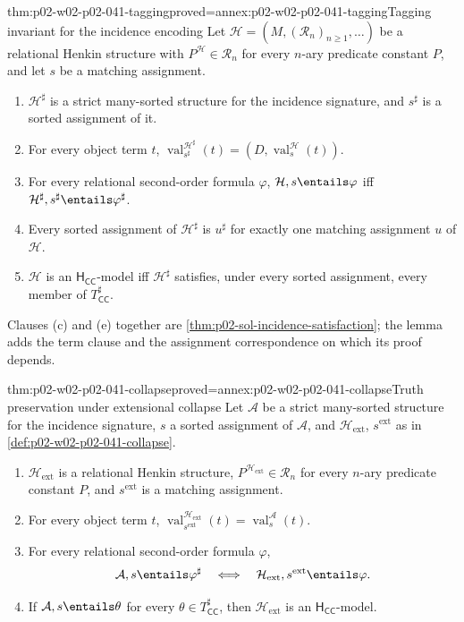 \begin{hblemma}{thm:p02-w02-p02-041-tagging}{proved=annex:p02-w02-p02-041-tagging}{Tagging invariant for the incidence encoding}
Let \(\mathcal H=(M,(\mathcal R_n)_{n\geq1},\ldots)\) be a relational Henkin
structure with \(P^{\mathcal H}\in\mathcal R_n\) for every \(n\)-ary predicate
constant \(P\), and let \(s\) be a matching assignment.
\begin{enumerate}
\item[(a)] \(\mathcal H^\sharp\) is a strict many-sorted structure for the
incidence signature, and \(s^\sharp\) is a sorted assignment of it.
\item[(b)] For every object term \(t\),
\(\operatorname{val}^{\mathcal H^\sharp}_{s^\sharp}(t)=(D,\operatorname{val}^{\mathcal H}_s(t))\).
\item[(c)] For every relational second-order formula \(\varphi\),
\(\mathcal H,s\entails\varphi\) iff
\(\mathcal H^\sharp,s^\sharp\entails\varphi^\sharp\).
\item[(d)] Every sorted assignment of \(\mathcal H^\sharp\) is \(u^\sharp\) for
exactly one matching assignment \(u\) of \(\mathcal H\).
\item[(e)] \(\mathcal H\) is an \(\mathsf H_{\mathsf{CC}}\)-model iff
\(\mathcal H^\sharp\) satisfies, under every sorted assignment, every member of
\(T_{\mathsf{CC}}^\sharp\).
\end{enumerate}
\end{hblemma}

Clauses (c) and (e) together are \cref{thm:p02-sol-incidence-satisfaction};
the lemma adds the term clause and the assignment correspondence on which its
proof depends.

\begin{hbtheorem}{thm:p02-w02-p02-041-collapse}{proved=annex:p02-w02-p02-041-collapse}{Truth preservation under extensional collapse}
Let \(\mathcal A\) be a strict many-sorted structure for the incidence
signature, \(s\) a sorted assignment of \(\mathcal A\), and
\(\mathcal H_{\mathrm{ext}}\), \(s^{\mathrm{ext}}\) as in
\cref{def:p02-w02-p02-041-collapse}.
\begin{enumerate}
\item[(a)] \(\mathcal H_{\mathrm{ext}}\) is a relational Henkin structure,
\(P^{\mathcal H_{\mathrm{ext}}}\in\mathcal R_n\) for every \(n\)-ary predicate
constant \(P\), and \(s^{\mathrm{ext}}\) is a matching assignment.
\item[(b)] For every object term \(t\),
\(\operatorname{val}^{\mathcal H_{\mathrm{ext}}}_{s^{\mathrm{ext}}}(t)
=\operatorname{val}^{\mathcal A}_s(t)\).
\item[(c)] For every relational second-order formula \(\varphi\),
\[
 \mathcal A,s\entails\varphi^\sharp
 \quad\Longleftrightarrow\quad
 \mathcal H_{\mathrm{ext}},s^{\mathrm{ext}}\entails\varphi.
\]
\item[(d)] If \(\mathcal A,s\entails\theta\) for every
\(\theta\in T_{\mathsf{CC}}^\sharp\), then \(\mathcal H_{\mathrm{ext}}\) is an
\(\mathsf H_{\mathsf{CC}}\)-model.
\end{enumerate}
\end{hbtheorem}

